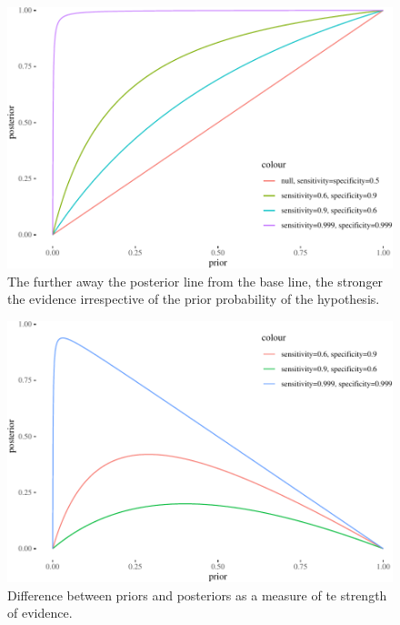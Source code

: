 \documentclass[
  10pt,
  dvipsnames,enabledeprecatedfontcommands]{scrartcl}
\begin{document}
\begin{figure}


\begin{center}\includegraphics[width=0.9\linewidth]{conjunction-paradox_files/figure-latex/unnamed-chunk-7-1} \end{center}

\caption{The further away the posterior line from the base 
line, the stronger the evidence irrespective 
of the prior probability of the hypothesis.}
\label{fig:strength-prior-post}
\end{figure}

\begin{figure}


\begin{center}\includegraphics[width=0.9\linewidth]{conjunction-paradox_files/figure-latex/unnamed-chunk-8-1} \end{center}

\caption{Difference between priors and posteriors as a measure of te strength of evidence.}
\label{fig:strength-difference}

\end{figure}
\end{document}
